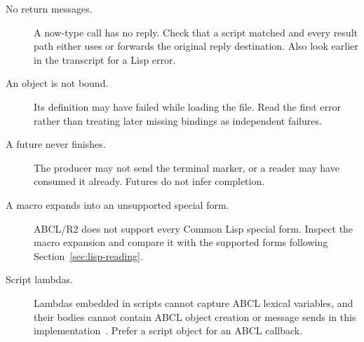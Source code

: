 \begin{description}
  \item[No return messages.]
  A now-type call has no reply. Check that a script matched and every
  result path either uses \code{!} or forwards the original reply
  destination. Also look earlier in the transcript for a Lisp error.
  \item[An object is not bound.]
  Its definition may have failed while loading the file. Read the first
  error rather than treating later missing bindings as independent failures.
  \item[A future never finishes.]
  The producer may not send the terminal marker, or a reader may have
  consumed it already. Futures do not infer completion.
  \item[A macro expands into an unsupported special form.]
  ABCL/R2 does not support every Common Lisp special form. Inspect the
  macro expansion and compare it with the supported forms following
  Section~\ref{sec:lisp-reading}.
  \item[Script lambdas.]
  Lambdas embedded in scripts cannot capture ABCL lexical variables,
  and their bodies cannot contain ABCL object creation or message sends
  in this implementation~\cite{guide}. Prefer a script object for
  an ABCL callback.
\end{description}

\clearpage

